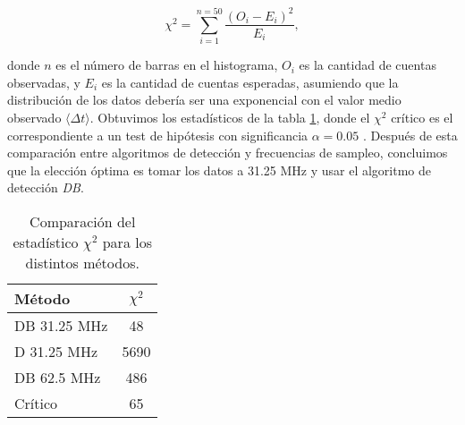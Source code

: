 \begin{equation}
    \chi^2  = \sum_{i=1}^{n=50} \frac{(O_i - E_i)^2}{E_i},
\end{equation}

\noindent donde $n$ es el número de barras en el histograma, $O_i$ es la cantidad de cuentas observadas, y $E_i$ es la cantidad de cuentas esperadas, asumiendo que la distribución de los datos debería ser una exponencial con el valor medio observado $\langle \Delta t \rangle$.
Obtuvimos los estadísticos de la tabla \ref{tab:chisq}, donde el $\chi^2$ crítico es el correspondiente a un test de hipótesis con significancia $\alpha = 0.05$ \cite{frodesen_probability_1979}.
Después de esta comparación entre algoritmos de detección y frecuencias de sampleo, concluimos que la elección óptima es tomar los datos a 31.25 MHz y usar el algoritmo de detección \textit{DB}.

\begin{table}[t]
\centering
\begin{tabular}{|l|c|}
    \hline
    \textbf{Método} & \boldmath$\chi^2$ \\
    \hline
    DB 31.25 MHz & 48 \\
    D 31.25 MHz & 5690 \\
    DB 62.5 MHz & 486 \\
    Crítico & 65 \\
    \hline
\end{tabular}
\caption{Comparación del estadístico $\chi^2$ para los distintos métodos.}
\label{tab:chisq}
\end{table}

